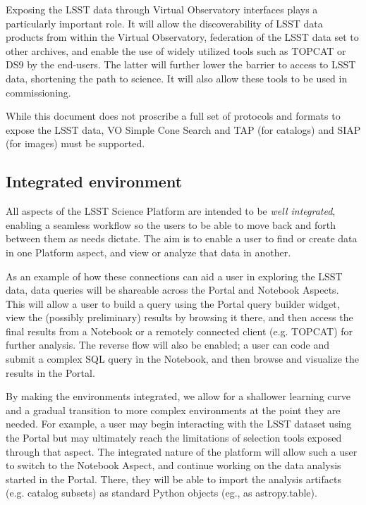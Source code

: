 Exposing the LSST data through Virtual Observatory interfaces plays a particularly important role. 
It will allow the discoverability of LSST data products from within the Virtual Observatory, federation of the LSST data set to other
archives, and enable the use of widely utilized tools such as TOPCAT or DS9 by the end-users. 
The latter will further lower the barrier to access to LSST data,
shortening the path to science. 
It will also allow these tools to be used in commissioning.

While this document does not proscribe a full set of protocols and formats to expose the LSST data, VO Simple Cone Search and TAP (for catalogs) and SIAP (for images) must be supported.

\subsection{Integrated environment}

All aspects of the LSST Science Platform are intended to be \textit{well integrated}, enabling a seamless workflow so the users to be able to move back and forth between them as needs dictate.  The aim is to enable a user to find or create data in one Platform aspect, and view or analyze that data in another.

As an example of how these connections can aid a user in exploring the LSST data, data queries will be shareable across the Portal and Notebook Aspects. This will allow a user to build a query using the Portal query builder widget, view the (possibly preliminary) results by browsing it there, and then access the final results from a Notebook or a remotely connected client (e.g. TOPCAT) for further analysis. The reverse flow will also be enabled; a user can code and submit a complex SQL query in the Notebook, and then browse and visualize the results in the Portal.

By making the environments integrated, we allow for a shallower learning curve and a gradual transition to more complex environments at the point they are needed. For example, a user may begin interacting with the LSST dataset using the Portal but may ultimately reach the limitations of selection tools exposed through that aspect. The integrated nature of the platform will allow such a user to switch to the Notebook Aspect, and continue working on the data analysis started in the Portal. There, they will be able to import the analysis artifacts (e.g. catalog subsets) as standard Python objects (eg., as astropy.table).

